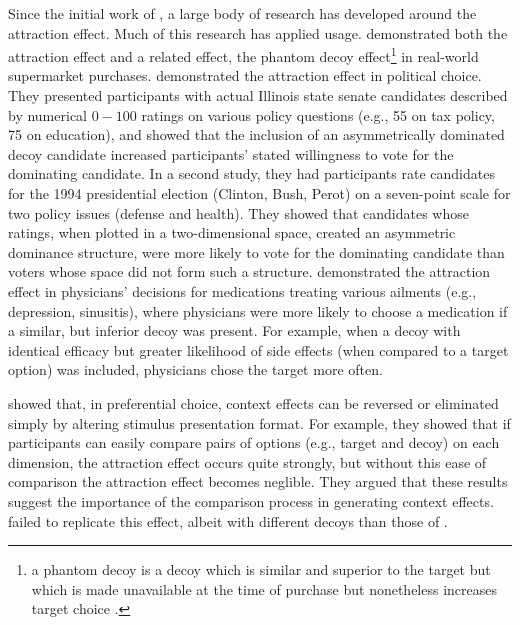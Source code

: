 Since the initial work of \textcite{huberAddingAsymmetricallyDominated1982d}, a large body of research has developed around the attraction effect. Much of this research has applied usage. \textcite{doyleRobustnessAsymmetricallyDominated1999} demonstrated both the attraction effect and a related effect, the phantom decoy effect\footnote{a phantom decoy is a decoy which is similar and superior to the target but which is made unavailable at the time of purchase but nonetheless increases target choice \parencite{pratkanisBriefHistoryResearch1992b}.} in real-world supermarket purchases. \textcite{o1995attraction} demonstrated the attraction effect in political choice. They presented participants with actual Illinois state senate candidates described by numerical $0-100$ ratings on various policy questions (e.g., 55 on tax policy, 75 on education), and showed that the inclusion of an asymmetrically dominated decoy candidate increased participants' stated willingness to vote for the dominating candidate. In a second study, they had participants rate candidates for the 1994 presidential election (Clinton, Bush, Perot) on a seven-point scale for two policy issues (defense and health). They showed that candidates whose ratings, when plotted in a two-dimensional space, created an asymmetric dominance structure, were more likely to vote for the dominating candidate than voters whose space did not form such a structure. \textcite{schwartz1999more} demonstrated the attraction effect in physicians' decisions for medications treating various ailments (e.g., depression, sinusitis), where physicians were more likely to choose a medication if a similar, but inferior decoy was present. For example, when a decoy with identical efficacy but greater likelihood of side effects (when compared to a target option) was included, physicians chose the target more often.

\textcite{cataldoComparisonProcessAccount2019b} showed that, in preferential choice, context effects can be reversed or eliminated simply by altering stimulus presentation format. For example, they showed that if participants can easily compare pairs of options (e.g., target and decoy) on each dimension, the attraction effect occurs quite strongly, but without this ease of comparison the attraction effect becomes neglible. They argued that these results suggest the importance of the comparison process in generating context effects. \textcite{hasan2025registered} failed to replicate this effect, albeit with different decoys than those of \textcite{cataldoComparisonProcessAccount2019b}. 

